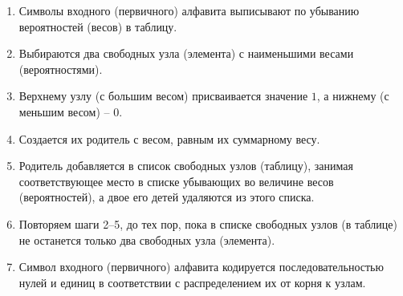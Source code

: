 \begin{enumerate}
  \item Символы входного (первичного) алфавита выписывают по убыванию вероятностей (весов) в таблицу.
  \item Выбираются два свободных узла (элемента) с наименьшими весами (вероятностями).
  \item Верхнему узлу (с большим весом) присваивается значение $1$, а нижнему (с меньшим весом) -- $0$.
  \item Создается их родитель с весом, равным их суммарному весу.
  \item Родитель добавляется в список свободных узлов (таблицу), занимая соответствующее место в списке убывающих во величине весов (вероятностей), а двое его детей удаляются из этого списка.
  \item Повторяем шаги 2--5, до тех пор, пока в списке свободных узлов (в таблице) не останется только два свободных узла (элемента).
  \item Символ входного (первичного) алфавита кодируется последовательностью нулей и единиц в соответствии с распределением их от корня к узлам.
\end{enumerate}

